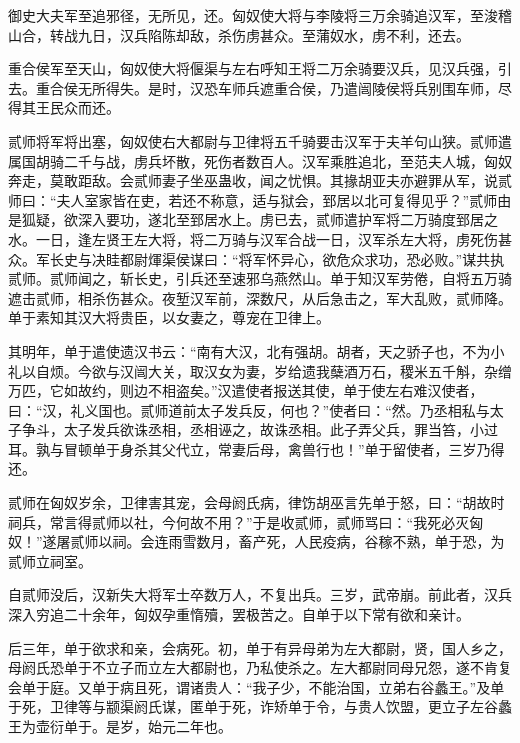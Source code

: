 \documentclass[12pt,UTF8]{ctexbook}
\begin{document}
御史大夫军至追邪径，无所见，还。匈奴使大将与李陵将三万余骑追汉军，至浚稽山合，转战九日，汉兵陷陈却敌，杀伤虏甚众。至蒲奴水，虏不利，还去。



重合侯军至天山，匈奴使大将偃渠与左右呼知王将二万余骑要汉兵，见汉兵强，引去。重合侯无所得失。是时，汉恐车师兵遮重合侯，乃遣闿陵侯将兵别围车师，尽得其王民众而还。



贰师将军将出塞，匈奴使右大都尉与卫律将五千骑要击汉军于夫羊句山狭。贰师遣属国胡骑二千与战，虏兵坏散，死伤者数百人。汉军乘胜追北，至范夫人城，匈奴奔走，莫敢距敌。会贰师妻子坐巫蛊收，闻之忧惧。其掾胡亚夫亦避罪从军，说贰师曰：“夫人室家皆在吏，若还不称意，适与狱会，郅居以北可复得见乎？”贰师由是狐疑，欲深入要功，遂北至郅居水上。虏已去，贰师遣护军将二万骑度郅居之水。一日，逢左贤王左大将，将二万骑与汉军合战一日，汉军杀左大将，虏死伤甚众。军长史与决眭都尉煇渠侯谋曰：“将军怀异心，欲危众求功，恐必败。”谋共执贰师。贰师闻之，斩长史，引兵还至速邪乌燕然山。单于知汉军劳倦，自将五万骑遮击贰师，相杀伤甚众。夜堑汉军前，深数尺，从后急击之，军大乱败，贰师降。单于素知其汉大将贵臣，以女妻之，尊宠在卫律上。



其明年，单于遣使遗汉书云：“南有大汉，北有强胡。胡者，天之骄子也，不为小礼以自烦。今欲与汉闿大关，取汉女为妻，岁给遗我蘖酒万石，稷米五千斛，杂缯万匹，它如故约，则边不相盗矣。”汉遣使者报送其使，单于使左右难汉使者，曰：“汉，礼义国也。贰师道前太子发兵反，何也？”使者曰：“然。乃丞相私与太子争斗，太子发兵欲诛丞相，丞相诬之，故诛丞相。此子弄父兵，罪当笞，小过耳。孰与冒顿单于身杀其父代立，常妻后母，禽兽行也！”单于留使者，三岁乃得还。



贰师在匈奴岁余，卫律害其宠，会母阏氏病，律饬胡巫言先单于怒，曰：“胡故时祠兵，常言得贰师以社，今何故不用？”于是收贰师，贰师骂曰：“我死必灭匈奴！”遂屠贰师以祠。会连雨雪数月，畜产死，人民疫病，谷稼不熟，单于恐，为贰师立祠室。



自贰师没后，汉新失大将军士卒数万人，不复出兵。三岁，武帝崩。前此者，汉兵深入穷追二十余年，匈奴孕重惰殰，罢极苦之。自单于以下常有欲和亲计。



后三年，单于欲求和亲，会病死。初，单于有异母弟为左大都尉，贤，国人乡之，母阏氏恐单于不立子而立左大都尉也，乃私使杀之。左大都尉同母兄怨，遂不肯复会单于庭。又单于病且死，谓诸贵人：“我子少，不能治国，立弟右谷蠡王。”及单于死，卫律等与颛渠阏氏谋，匿单于死，诈矫单于令，与贵人饮盟，更立子左谷蠡王为壶衍单于。是岁，始元二年也。
\end{document}
